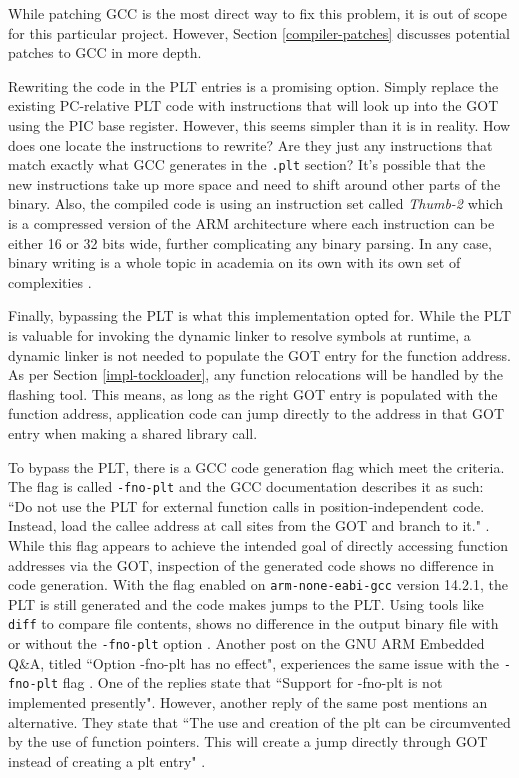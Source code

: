 \documentclass[12pt]{ucsddissertation}
\begin{document}
While patching GCC is the most direct way to fix this problem, it is out of scope for this particular project. However, Section \ref{compiler-patches} discusses potential patches to GCC in more depth. 

Rewriting the code in the PLT entries is a promising option. Simply replace the existing PC-relative PLT code with instructions that will look up into the GOT using the PIC base register. However, this seems simpler than it is in reality. How does one locate the instructions to rewrite? Are they just any instructions that match exactly what GCC generates in the \texttt{.plt} section? It's possible that the new instructions take up more space and need to shift around other parts of the binary. Also, the compiled code is using an instruction set called \textit{Thumb-2} which is a compressed version of the ARM architecture where each instruction can be either 16 or 32 bits wide, further complicating any binary parsing. In any case, binary writing is a whole topic in academia on its own with its own set of complexities \cite{binary-rewrite1, binary-rewrite2}.

Finally, bypassing the PLT is what this implementation opted for. While the PLT is valuable for invoking the dynamic linker to resolve symbols at runtime, a dynamic linker is not needed to populate the GOT entry for the function address. As per Section \ref{impl-tockloader}, any function relocations will be handled by the flashing tool. This means, as long as the right GOT entry is populated with the function address, application code can jump directly to the address in that GOT entry when making a shared library call. 

To bypass the PLT, there is a GCC code generation flag which meet the criteria. The flag is called \texttt{-fno-plt} and the GCC documentation describes it as such: ``Do not use the PLT for external function calls in position-independent code. Instead, load the callee address at call sites from the GOT and branch to it." \cite{gcc-codegen}. While this flag appears to achieve the intended goal of directly accessing function addresses via the GOT, inspection of the generated code shows no difference in code generation. With the flag enabled on \texttt{arm-none-eabi-gcc} version 14.2.1, the PLT is still generated and the code makes jumps to the PLT. Using tools like \texttt{diff} to compare file contents, shows no difference in the output binary file with or without the \texttt{-fno-plt} option \cite{diff}. Another post on the GNU ARM Embedded Q\&A, titled ``Option -fno-plt has no effect", experiences the same issue with the \texttt{-fno-plt} flag \cite{no-plt}. One of the replies state that ``Support for -fno-plt is not implemented presently". However, another reply of the same post mentions an alternative. They state that ``The use and creation of the plt can be circumvented by the use of function pointers. This will create a jump directly through GOT instead of creating a plt entry" \cite{no-plt}. 
\end{document}
